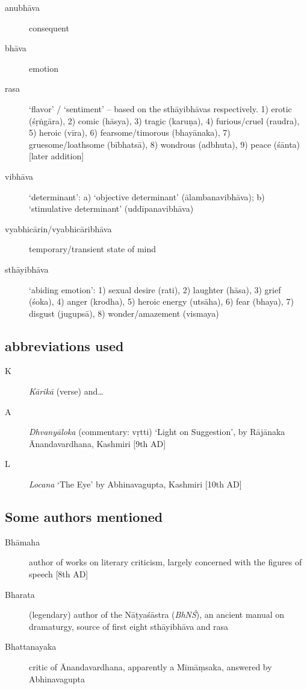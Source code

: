 \documentclass[12pt]{article}
\begin{document}
\begin{description}
	\item[anubhāva] consequent

	\item[bhāva] emotion

	\item[rasa] ‘flavor’ / ‘sentiment’ -- based on the sthāyibhāvas respectively.
	      1) erotic (śṛṅgāra),
	      2) comic (hāsya),
	      3) tragic (karuṇa),
	      4) furious/cruel (raudra),
	      5) heroic (vīra),
	      6) fearsome/timorous (bhayānaka),
	      7) gruesome/loathsome (bībhatsā),
	      8) wondrous (adbhuta),
	      9) peace (śānta) [later addition]

	\item[vibhāva] ‘determinant’:
	      a) ‘objective determinant’ (ālambanavibhāva);
	      b) ‘stimulative determinant’ (uddīpanavibhāva)

	\item[vyabhicārin/vyabhicāribhāva] temporary/transient state of mind

	\item[sthāyibhāva] ‘abiding emotion’:
	      1) sexual desire (rati),
	      2) laughter (hāsa),
	      3) grief (śoka),
	      4) anger (krodha),
	      5) heroic energy (utsāha),
	      6) fear (bhaya),
	      7) disgust (jugupsā),
	      8) wonder/amazement (vismaya)

\end{description}


\subsection{abbreviations used}

\begin{description}
	\item[K] \textit{Kārikā} (verse) and\dots

	\item[A] \textit{Dhvanyāloka} (commentary: vṛtti) `Light on Suggestion', by Rājānaka \\ Ānandavardhana, Kashmiri [9th AD]

	\item[L] \textit{Locana} `The Eye' by Abhinavagupta, Kashmiri [10th AD]
\end{description}


\subsection{Some authors mentioned}

\begin{description}
	\item[Bhāmaha] author of works on literary criticism, largely concerned with the figures of speech [8th AD]

	\item[Bharata] (legendary) author of the Nāṭyaśāstra (\textit{BhNŚ}), an ancient manual on dramaturgy, source of first eight sthāyibhāva and rasa

	\item[Bhattanayaka] critic of Ānandavardhana, apparently a Mīmāṃsaka, answered by Abhinavagupta
\end{description}
\end{document}
